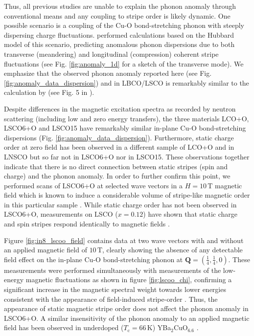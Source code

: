 Thus, all previous studies are unable to explain the phonon anomaly through conventional means and any coupling to stripe order is likely dynamic. One possible scenario is a coupling of the Cu-O bond-stretching phonon with steeply dispersing charge fluctuations. \citeauthor{Kaneshita2002} performed calculations based on the Hubbard model of this scenario, predicting anomalous phonon dispersions due to both transverse (meandering) and longitudinal (compression) coherent stripe fluctuations \cite{Kaneshita2002} (see Fig. \ref{fig:anomaly_1d} for a sketch of the transverse mode). We emphasize that the observed phonon anomaly reported here (see Fig. \ref{fig:anomaly_data_dispersion}) and in LBCO/LSCO \cite{Reznik2006, Reznik2007} is remarkably similar to the calculation by \citeauthor{Kaneshita2002} (see Fig. 5 in \cite{Kaneshita2002}).

Despite differences in the magnetic excitation spectra as recorded by neutron scattering (including low and zero energy transfers), the three materials LCO+O, LSCO6+O and LSCO15 have remarkably similar in-plane Cu-O bond-stretching dispersions (Fig. \ref{fig:anomaly_data_dispersion}). Furthermore, static charge order at zero field has been observed in a different sample of LCO+O \cite{Zhang2018} and in LNSCO \cite{Tranquada1996} but so far not in LSCO6+O nor in LSCO15. These observations together indicate that there is no direct connection between static stripes (spin and charge) and the phonon anomaly. In order to further confirm this point, we performed scans of LSCO6+O at selected wave vectors in a $H=10\,\text{T}$ magnetic field which is known to induce a considerable volume of stripe-like magnetic order in this particular sample \cite{Holm2019}. While static charge order has not been observed in LSCO6+O, measurements on LSCO ($x=0.12$) have shown that static charge and spin stripes respond identically to magnetic fields \cite{Christensen2014}.

Figure \ref{fig:in8_lscoo_field} contains data at two wave vectors with and without an applied magnetic field of $10\,\text{T}$, clearly showing the absence of any detectable field effect on the in-plane Cu-O bond-stretching phonon at $\bm{Q}=(\frac{1}{4},\frac{1}{4},0)$. These measurements were performed simultaneously with measurements of the low-energy magnetic fluctuations as shown in figure \ref{fig:lscoo_chi}, confirming a significant increase in the magnetic spectral weight towards lower energies consistent with the appearance of field-induced stripe-order \cite{Holm2019}. Thus, the appearance of static magnetic stripe order does not affect the phonon anomaly in LSCO6+O. A similar insensitivity of the phonon anomaly to an applied magnetic field has been observed in underdoped ($T_\text{c} = 66\,\text{K}$) YBa$_2$CuO$_{6.6}$ \cite{Reznik2016}.


